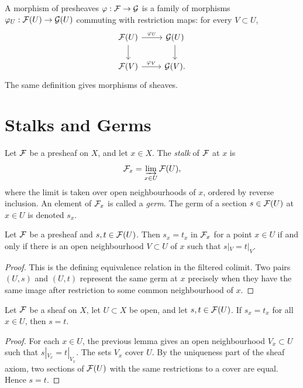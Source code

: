 \begin{definition}
A morphism of presheaves \(\varphi:\mathcal{F}\to \mathcal{G}\) is a family of morphisms
\(\varphi_U:\mathcal{F}(U)\to \mathcal{G}(U)\) commuting with restriction maps: for every
\(V\subset U\),
\[
\begin{tikzcd}
\FF(U) \arrow[r,"\varphi_U"] \arrow[d] & \GG(U) \arrow[d]\\
\FF(V) \arrow[r,"\varphi_V"] & \GG(V).
\end{tikzcd}
\]
The same definition gives morphisms of sheaves.
\end{definition}

\section{Stalks and Germs}

\begin{definition}
Let \(\mathcal{F}\) be a presheaf on \(X\), and let \(x\in X\).  The \emph{stalk} of
\(\mathcal{F}\) at \(x\) is
\[
    \mathcal{F}_x=\varinjlim_{x\in U}\mathcal{F}(U),
\]
where the limit is taken over open neighbourhoods of \(x\), ordered by reverse
inclusion.  An element of \(\mathcal{F}_x\) is called a \emph{germ}.  The germ of a
section \(s\in \mathcal{F}(U)\) at \(x\in U\) is denoted \(s_x\).
\end{definition}

\begin{lemma}
Let \(\mathcal{F}\) be a presheaf and \(s,t\in \mathcal{F}(U)\).  Then \(s_x=t_x\) in
\(\mathcal{F}_x\) for a point \(x\in U\) if and only if there is an open neighbourhood
\(V\subset U\) of \(x\) such that \(s|_V=t|_V\).
\end{lemma}

\begin{proof}
This is the defining equivalence relation in the filtered colimit.  Two pairs
\((U,s)\) and \((U,t)\) represent the same germ at \(x\) precisely when they
have the same image after restriction to some common neighbourhood of \(x\).
\end{proof}

\begin{proposition}
Let \(\mathcal{F}\) be a sheaf on \(X\), let \(U\subset X\) be open, and let
\(s,t\in \mathcal{F}(U)\).  If \(s_x=t_x\) for all \(x\in U\), then \(s=t\).
\end{proposition}

\begin{proof}
For each \(x\in U\), the previous lemma gives an open neighbourhood
\(V_x\subset U\) such that \(s|_{V_x}=t|_{V_x}\).  The sets \(V_x\) cover \(U\).
By the uniqueness part of the sheaf axiom, two sections of \(\mathcal{F}(U)\) with the
same restrictions to a cover are equal.  Hence \(s=t\).
\end{proof}

